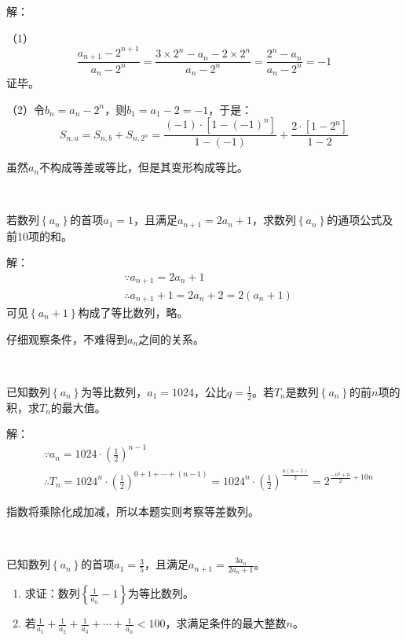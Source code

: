 解：

（1）
\[
\frac{a_{n+1}-2^{n+1}}{a_n-2^n}=\frac{3\times 2^n-a_n-2\times 2^n}{a_n-2^n}=\frac{2^n-a_n}{a_n-2^n}=-1
\]
证毕。

（2）令$b_n=a_n-2^n$，则$b_1=a_1-2=-1$，于是：
\[
S_{n,a}=S_{n,b}+S_{n,2^n}=\frac{\left( -1 \right) \cdot \left[ 1-\left( -1 \right) ^n \right]}{1-\left( -1 \right)}+\frac{2\cdot \left[ 1-2^n \right]}{1-2}
\]

\begin{tcolorbox}
虽然$a_n$不构成等差或等比，但是其变形构成等比。
\end{tcolorbox}

~

\begin{example}
若数列$\left\{ a_n \right\} $的首项$a_1=1$，且满足$a_{n+1}=2a_n+1$，求数列$\left\{ a_n \right\} $的通项公式及前10项的和。
\end{example}

解：
\begin{align*}
&\because a_{n+1}=2a_n+1 \\
&\therefore a_{n+1}+1=2a_n+2=2\left( a_n+1 \right)
\end{align*}
可见$\left\{ a_n+1 \right\} $构成了等比数列，略。

\begin{tcolorbox}
仔细观察条件，不难得到$a_n$之间的关系。
\end{tcolorbox}

~

\begin{example}
已知数列$\left\{ a_n \right\} $为等比数列，$a_1=1024$，公比$q=\frac{1}{2}$。若$T_n$是数列$\left\{ a_n \right\} $的前$n$项的积，求$T_n$的最大值。
\end{example}

解：
\begin{align*}
&\because a_n=1024\cdot \left( \frac{1}{2} \right) ^{n-1} \\
&\therefore T_n=1024^n\cdot \left( \frac{1}{2} \right) ^{0+1+\cdots +\left( n-1 \right)}=1024^n\cdot \left( \frac{1}{2} \right) ^{\frac{n\left( n-1 \right)}{2}}=2^{\frac{-n^2+n}{2}+10n}
\end{align*}

\begin{tcolorbox}
指数将乘除化成加减，所以本题实则考察等差数列。
\end{tcolorbox}

~

\begin{example}
已知数列$\left\{ a_n \right\} $的首项$a_1=\frac{3}{5}$，且满足$a_{n+1}=\frac{3a_n}{2a_n+1}$。
\begin{enumerate}
    \item 求证：数列$\left\{ \frac{1}{a_n}-1 \right\} $为等比数列。
    \item 若$\frac{1}{a_1}+\frac{1}{a_2}+\frac{1}{a_3}+\cdots +\frac{1}{a_n}<100$，求满足条件的最大整数$n$。
\end{enumerate}
\end{example}

